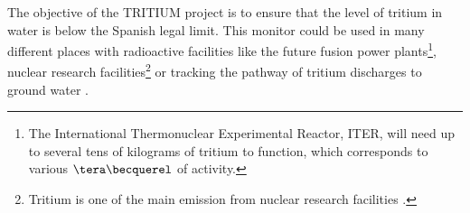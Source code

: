 The objective of the TRITIUM project is to ensure that the level of tritium in water is below the Spanish legal limit. This monitor could be used in many different places with radioactive facilities like the future fusion power plants\footnote{The International Thermonuclear Experimental Reactor, ITER, will need up to several tens of kilograms of tritium to function, which corresponds to various $\tera\becquerel$ of activity.}, nuclear research facilities\footnote{Tritium is one of the main emission from nuclear research facilities \cite{FERMILAB, BrookHavenNationalLaboratory}.} or tracking the pathway of tritium discharges to ground water \cite{TrackingTritium}. 

